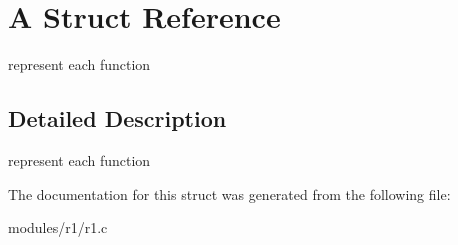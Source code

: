 \hypertarget{structA}{}\section{A Struct Reference}
\label{structA}


represent each function  




\subsection{Detailed Description}
represent each function 

The documentation for this struct was generated from the following file\+:\begin{DoxyCompactItemize}
\item 
modules/r1/r1.\+c\end{DoxyCompactItemize}
